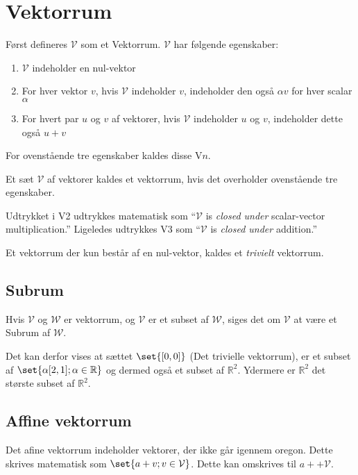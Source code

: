 \section{Vektorrum}
Først defineres $\mathcal{V}$ som et Vektorrum.
$\mathcal{V}$ har følgende egenskaber:
\begin{enumerate}
    \item $\mathcal{V}$ indeholder en nul-vektor
    \item For hver vektor $v$, hvis $\mathcal{V}$ indeholder $v$, indeholder den også $\alpha v$ for hver scalar $\alpha$
    \item For hvert par $u$ og $v$ af vektorer, hvis $\mathcal{V}$ indeholder $u$ og $v$, indeholder dette også $u+v$
\end{enumerate}
For ovenstående tre egenskaber kaldes disse V$n$.
\begin{frdef}
    Et sæt $\mathcal{V}$ af vektorer kaldes et vektorrum, hvis det overholder ovenstående tre egenskaber.
\end{frdef}
Udtrykket i V2 udtrykkes matematisk som ``$\mathcal{V}$ is \textit{closed under} scalar-vector multiplication.''
Ligeledes udtrykkes V3 som ``$\mathcal{V}$ is \textit{closed under} addition.''
\begin{frdef}
    Et vektorrum der kun består af en nul-vektor, kaldes et \textit{trivielt} vektorrum.
\end{frdef}

\subsection{Subrum}
\begin{frdef}
    Hvis $\mathcal{V}$ og $\mathcal{W}$ er vektorrum, og $\mathcal{V}$ er et subset af $\mathcal{W}$, siges det om $\mathcal{V}$ at være et Subrum af $\mathcal{W}$.
\end{frdef}
Det kan derfor vises at sættet $\set{[0,0]}$ (Det trivielle vektorrum), er et subset af $\set{\alpha[2,1];\alpha\in\mathbb{R}}$ og dermed også et subset af $\mathbb{R}^2$.
Ydermere er $\mathbb{R}^2$ det største subset af $\mathbb{R}^2$.

\subsection{Affine vektorrum}
Det afine vektorrum indeholder vektorer, der ikke går igennem oregon.
Dette skrives matematisk som $\set{a+v;v\in\mathcal{V}}$.
Dette kan omskrives til $a++\mathcal{V}$.

